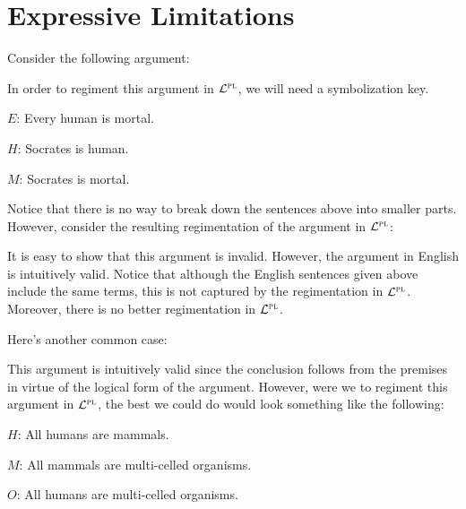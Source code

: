 \section{Expressive Limitations}

Consider the following argument:

\begin{earg}
\end{earg}

In order to regiment this argument in $\mathcal{L}^{\textsc{pl}}$, we will need a symbolization key. 

\begin{ekey}
  \item[$E$:] Every human is mortal.
  \item[$H$:] Socrates is human.
  \item[$M$:] Socrates is mortal.
\end{ekey}

Notice that there is no way to break down the sentences above into smaller parts.
However, consider the resulting regimentation of the argument in $\mathcal{L}^{\textsc{pl}}$:

\begin{earg}
\end{earg}

It is easy to show that this argument is invalid.
However, the argument in English is intuitively valid.
Notice that although the English sentences given above include the same terms, this is not captured by the regimentation in $\mathcal{L}^{\textsc{pl}}$.
Moreover, there is no better regimentation in $\mathcal{L}^{\textsc{pl}}$.

Here's another common case:

\begin{earg}
\end{earg}

This argument is intuitively valid since the conclusion follows from the premises in virtue of the logical form of the argument.
However, were we to regiment this argument in $\mathcal{L}^{\textsc{pl}}$, the best we could do would look something like the following:

\begin{ekey}
  \item[$H$:] All humans are mammals.
  \item[$M$:] All mammals are multi-celled organisms.
  \item[$O$:] All humans are multi-celled organisms.
\end{ekey}

